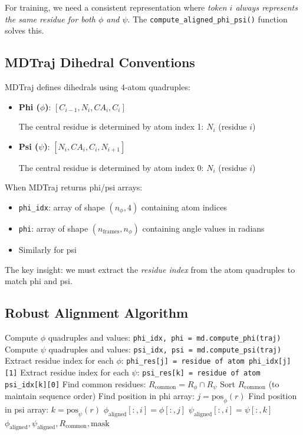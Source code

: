 \documentclass[12pt,a4paper]{article}
\begin{document}
For training, we need a consistent representation where \textit{token $i$ always represents the same residue for both $\phi$ and $\psi$}. The \texttt{compute\_aligned\_phi\_psi()} function solves this.

\subsection{MDTraj Dihedral Conventions}

MDTraj defines dihedrals using 4-atom quadruples:

\begin{itemize}
    \item \textbf{Phi ($\phi$)}: $[C_{i-1}, N_i, CA_i, C_i]$

    The central residue is determined by atom index 1: $N_i$ (residue $i$)

    \item \textbf{Psi ($\psi$)}: $[N_i, CA_i, C_i, N_{i+1}]$

    The central residue is determined by atom index 0: $N_i$ (residue $i$)
\end{itemize}

When MDTraj returns phi/psi arrays:
\begin{itemize}
    \item \texttt{phi\_idx}: array of shape $(n_{\phi}, 4)$ containing atom indices
    \item \texttt{phi}: array of shape $(n_{\text{frames}}, n_{\phi})$ containing angle values in radians
    \item Similarly for psi
\end{itemize}

The key insight: we must extract the \textit{residue index} from the atom quadruples to match phi and psi.

\subsection{Robust Alignment Algorithm}

\begin{algorithm}[H]
\caption{Robust $\phi/\psi$ Alignment}
\begin{algorithmic}[1]
\STATE Compute $\phi$ quadruples and values: \texttt{phi\_idx, phi = md.compute\_phi(traj)}
\STATE Compute $\psi$ quadruples and values: \texttt{psi\_idx, psi = md.compute\_psi(traj)}
\STATE Extract residue index for each $\phi$: \texttt{phi\_res[j] = residue of atom phi\_idx[j][1]}
\STATE Extract residue index for each $\psi$: \texttt{psi\_res[k] = residue of atom psi\_idx[k][0]}
\STATE Find common residues: $R_{\text{common}} = R_\phi \cap R_\psi$
\STATE Sort $R_{\text{common}}$ (to maintain sequence order)
    \STATE Find position in phi array: $j = \text{pos}_\phi(r)$
    \STATE Find position in psi array: $k = \text{pos}_\psi(r)$
    \STATE $\phi_{\text{aligned}}[:, i] = \phi[:, j]$
    \STATE $\psi_{\text{aligned}}[:, i] = \psi[:, k]$
\ENDFOR
\RETURN $\phi_{\text{aligned}}, \psi_{\text{aligned}}, R_{\text{common}}, \text{mask}$
\end{algorithmic}
\end{algorithm}
\end{document}
